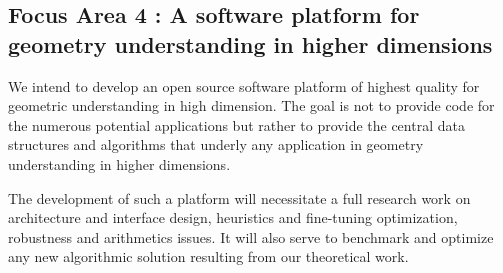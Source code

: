 
\subsection*{Focus Area 4 : A software platform for geometry understanding in higher
  dimensions}

We intend to develop an open source software platform of highest
quality %
for geometric understanding in high dimension.  The goal
is not to provide code for the numerous potential applications but
rather to provide the central data structures and algorithms that
underly any application in geometry understanding in higher
dimensions.

The development of such a
platform will necessitate a full research work on architecture and
interface design, heuristics and fine-tuning optimization, robustness
and arithmetics issues. It will also serve to benchmark and optimize any
new algorithmic solution resulting from our theoretical work. 
%
%
%
